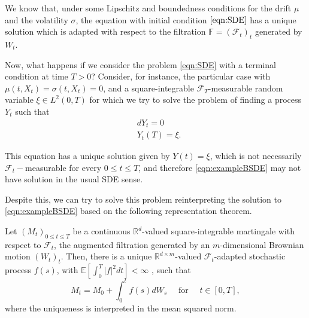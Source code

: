 We know that, under some Lipschitz and boundedness conditions for the drift $\mu$ and the volatility $\sigma$, the equation with initial condition $\eqref{eqn:SDE}$ has a unique solution which is adapted with respect to the filtration $\mathbb{F}=(\mathcal{F}_t)_t$ generated by $W_t$.

Now, what happens if we consider the problem \eqref{eqn:SDE} with a terminal condition at time $T>0$? Consider, for instance, the particular case with $\mu(t,X_t)=\sigma(t,X_t)=0$, and a square-integrable $\mathcal{F}_T$-measurable random variable $\xi\in L^2(0,T)$ for which we try to solve the problem of finding a process $Y_t$ such that
\begin{equation}
	\label{eqn:exampleBSDE}
	\begin{split}
		&dY_t=0\\
		&Y_t(T)=\xi.
	\end{split}
\end{equation}

This equation has a unique solution given by $Y(t)=\xi$, which is not necessarily $\mathcal{F}_t-$measurable for every $0\leq t \leq T$, and therefore \eqref{eqn:exampleBSDE} may not have solution in the usual SDE sense. 

Despite this, we can try to solve this problem reinterpreting the solution to \eqref{eqn:exampleBSDE} based on the following representation theorem.
\begin{theorem}
	\label{thm:MRT} Let $(M_t)_{0\leq t \leq T}$ be a continuous $\mathbb{R}^d$-valued square-integrable martingale with respect to $\mathcal{F}_t$, the augmented filtration generated by an $m$-dimensional Brownian motion $(W_t)_t$. Then, there is a unique $\mathbb{R}^{d\times m}$-valued $\mathcal{F}_t$-adapted stochastic process $f(s)$, with $\mathbb{E}[\int_{0}^{T}|f|^2dt]<\infty$ , such that 
	\begin{equation}
		M_t=M_0+\int_{0}^{t}f(s)dW_s \quad \text{ for } \quad t\in [0,T],
	\end{equation}
	where the uniqueness is interpreted in the mean squared norm.
\end{theorem}

